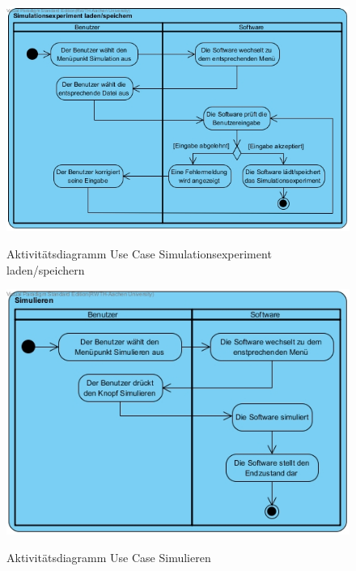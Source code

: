 \begin{figure}[H]
	\centering
	\includegraphics[scale=.5]{Bilder/Simulationsexperiment_laden_speichern.jpg}\\
	\caption{Aktivitätsdiagramm Use Case Simulationsexperiment laden/speichern}
	\label{Aktivitätsdiagramm Use Case Simulationsexperiment laden/speichern}
\end{figure}

\begin{figure}[H]
	\centering
	\includegraphics[scale=.5]{Bilder/Simulieren.jpg}\\
	\caption{Aktivitätsdiagramm Use Case Simulieren}
	\label{Aktivitätsdiagramm Use Case Simulieren}
\end{figure}

